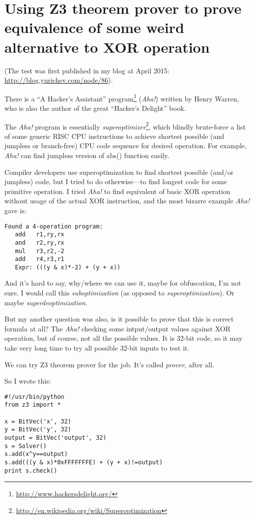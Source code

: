 \section{Using Z3 theorem prover to prove equivalence of some weird alternative to XOR operation}
\label{weird_XOR}

(The test was first published in my blog at April 2015: \url{http://blog.yurichev.com/node/86}).

There is a ``A Hacker's Assistant'' program\footnote{\url{http://www.hackersdelight.org/}} (\emph{Aha!}) written by Henry Warren,
who is also the author of the great ``Hacker's Delight'' book.

The \emph{Aha!} program is essentially \emph{superoptimizer}\footnote{\url{http://en.wikipedia.org/wiki/Superoptimization}},
which blindly brute-force a list of some generic RISC CPU instructions to achieve shortest possible (and jumpless or branch-free) 
CPU code sequence for desired operation.
For example, \emph{Aha!} can find jumpless version of abs() function easily.

Compiler developers use superoptimization to find shortest possible (and/or jumpless) code,
but I tried to do otherwise---to find longest code for some primitive operation.
I tried \emph{Aha!} to find equivalent of basic XOR operation without usage of the actual XOR instruction,
and the most bizarre example \emph{Aha!} gave is:

\begin{lstlisting}
Found a 4-operation program:
   add   r1,ry,rx
   and   r2,ry,rx
   mul   r3,r2,-2
   add   r4,r3,r1
   Expr: (((y & x)*-2) + (y + x))
\end{lstlisting}

And it's hard to say, why/where we can use it, maybe for obfuscation, I'm not sure.
I would call this \emph{suboptimization} (as opposed to \emph{superoptimization}).
Or maybe \emph{superdeoptimization}.

But my another question was also, is it possible to prove that this is correct formula at all?
The \emph{Aha!} checking some intput/output values against XOR operation, but of course, not all the possible values.
It is 32-bit code, so it may take very long time to try all possible 32-bit inputs to test it.

We can try Z3 theorem prover for the job. It's called \emph{prover}, after all.

So I wrote this:

\begin{lstlisting}
#!/usr/bin/python
from z3 import *

x = BitVec('x', 32)
y = BitVec('y', 32)
output = BitVec('output', 32)
s = Solver()
s.add(x^y==output)
s.add(((y & x)*0xFFFFFFFE) + (y + x)!=output)
print s.check()
\end{lstlisting}

